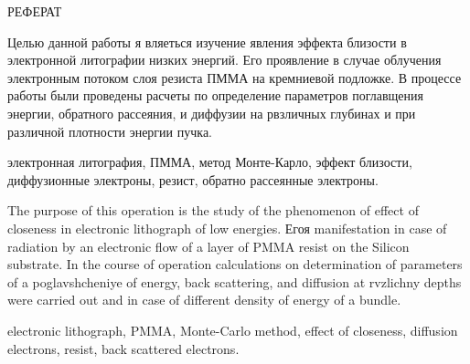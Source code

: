 \begin{center}
РЕФЕРАТ
\end{center}

Целью данной работы я вляеться изучение явления эффекта близости в электронной литографии низких энергий.
Его проявление в случае облучения электронным потоком слоя резиста ПММА на кремниевой подложке. В процессе работы были проведены расчеты по определение параметров поглавщения энергии, обратного рассеяния, и диффузии на рвзличных глубинах и при различной плотности энергии пучка.
\vspace*{1cm}

\hspace{-1.25cm}электронная литография, ПММА, метод Монте-Карло, эффект близости, диффузионные электроны, резист, обратно рассеянные электроны.
 \vspace*{1cm}

The purpose of this operation is the study of the phenomenon of effect of closeness in electronic lithograph of low energies.
Егоя manifestation in case of radiation by an electronic flow of a layer of PMMA resist on the Silicon substrate. In the course of operation calculations on determination of parameters of a poglavshcheniye of energy, back scattering, and diffusion at rvzlichny depths were carried out and in case of different density of energy of a bundle.
\vspace*{1cm}

\hspace{-1.25cm}electronic lithograph, PMMA, Monte-Carlo method, effect of closeness, diffusion electrons, resist, back scattered electrons.

